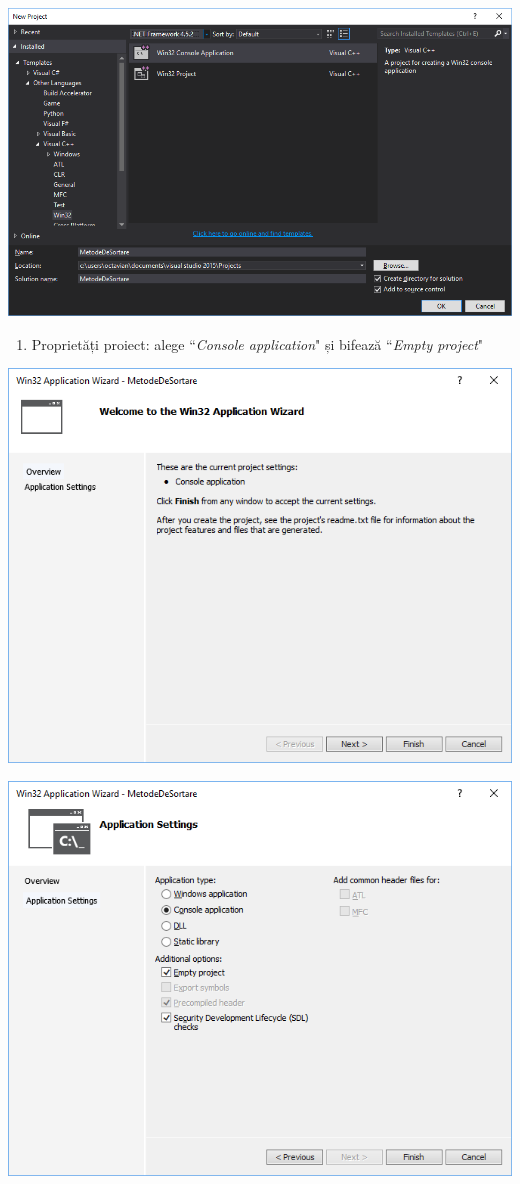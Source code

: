 \documentclass[../ro-fa-lab.tex]{subfiles}
\begin{document}
\includegraphics[width=\textwidth]{../Resources/lab0/image1.png}

\begin{enumerate}
\def\labelenumi{\arabic{enumi}.}
\setcounter{enumi}{2}
\item
  Proprietăți proiect: alege ``\emph{Console application}" și bifează
  ``\emph{Empty project}"
\end{enumerate}

\includegraphics[width=\textwidth]{../Resources/lab0/image2.png}

\includegraphics[width=\textwidth]{../Resources/lab0/image3.png}
\end{document}
